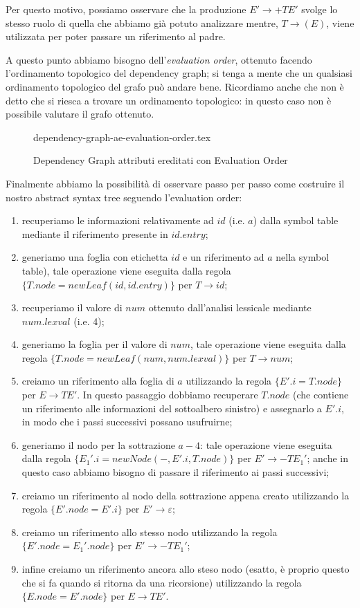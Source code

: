\documentclass[class=book, crop=false, oneside, 12pt]{standalone}
\begin{document}
Per questo motivo, possiamo osservare che la produzione \(E' \to +TE'\) svolge lo stesso ruolo di quella che abbiamo già potuto analizzare mentre, \(T \to (E)\), viene utilizzata per poter passare un riferimento al padre. 

A questo punto abbiamo bisogno dell'\emph{evaluation order}, ottenuto facendo l'ordinamento topologico del dependency graph; si tenga a mente che un qualsiasi ordinamento topologico del grafo può andare bene. Ricordiamo anche che non è detto che si riesca a trovare un ordinamento topologico: in questo caso non è possibile valutare il grafo ottenuto.

\begin{figure}[H]
	\centering
    {dependency-graph-ae-evaluation-order.tex}
    \caption{Dependency Graph attributi ereditati con Evaluation Order}
    \label{fig:dependency-graph-ae-evaluation-order}
\end{figure}

Finalmente abbiamo la possibilità di osservare passo per passo come costruire il nostro abstract syntax tree seguendo l'evaluation order:

\begin{enumerate}
    \item recuperiamo le informazioni relativamente ad \(id\) (i.e. \(a\)) dalla symbol table mediante il riferimento presente in \(id.entry\);
    \item generiamo una foglia con etichetta \(id\) e un riferimento ad \(a\) nella symbol table), tale operazione viene eseguita dalla regola \(\{T.node = newLeaf(id, id.entry)\}\) per  \(T \to id\);
    \item recuperiamo il valore di \(num\) ottenuto dall'analisi lessicale mediante \(num.lexval\) (i.e. 4);
    \item generiamo la foglia per il valore di \(num\), tale operazione viene eseguita dalla regola \(\{T.node = newLeaf(num, num.lexval)\}\) per \(T \to num\);
    \item creiamo un riferimento alla foglia di \(a\) utilizzando la regola \(\{E'.i = T.node\}\) per  \(E \to TE'\). In questo passaggio dobbiamo recuperare \(T.node\) (che contiene un riferimento alle informazioni del sottoalbero sinistro) e assegnarlo a \(E'.i\), in modo che i passi successivi possano usufruirne;
    \item generiamo il nodo per la sottrazione \(a-4\): tale operazione viene eseguita dalla regola \(\{E_{1}'.i = newNode(-, E'.i, T.node)\}\) per \(E' \to -TE_{1}'\); anche in questo caso abbiamo bisogno di passare il riferimento ai passi successivi;
    \item creiamo un riferimento al nodo della sottrazione appena creato utilizzando la regola \(\{E'.node = E'.i\}\) per \(E' \to \varepsilon\);
    \item creiamo un riferimento allo stesso nodo utilizzando la regola \(\{E'.node = E_{1}'.node\}\) per \(E' \to -TE_{1}'\);
    \item infine creiamo un riferimento ancora allo steso nodo (esatto, è proprio questo che si fa quando si ritorna da una ricorsione) utilizzando la regola \(\{E.node = E'.node\}\) per \(E \to TE'\).
\end{enumerate}
\end{document}
